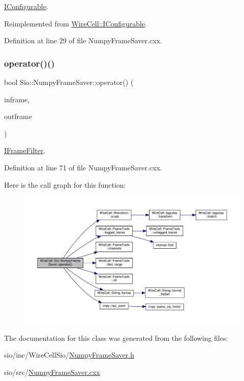 \hyperlink{class_wire_cell_1_1_i_configurable}{I\+Configurable}. 



Reimplemented from \hyperlink{class_wire_cell_1_1_i_configurable_a54841b2da3d1ea02189478bff96f7998}{Wire\+Cell\+::\+I\+Configurable}.



Definition at line 29 of file Numpy\+Frame\+Saver.\+cxx.

\mbox{\label{class_wire_cell_1_1_sio_1_1_numpy_frame_saver_aa4e56c63747bea244fd47f07b0d59303}} 
\subsubsection{\texorpdfstring{operator()()}{operator()()}}
{\footnotesize\ttfamily bool Sio\+::\+Numpy\+Frame\+Saver\+::operator() (\begin{DoxyParamCaption}\item[{const \hyperlink{class_wire_cell_1_1_i_data_aff870b3ae8333cf9265941eef62498bc}{Wire\+Cell\+::\+I\+Frame\+::pointer} \&}]{inframe,  }\item[{\hyperlink{class_wire_cell_1_1_i_data_aff870b3ae8333cf9265941eef62498bc}{Wire\+Cell\+::\+I\+Frame\+::pointer} \&}]{outframe }\end{DoxyParamCaption})\hspace{0.3cm}{\ttfamily [virtual]}}



\hyperlink{class_wire_cell_1_1_i_frame_filter}{I\+Frame\+Filter}. 



Definition at line 71 of file Numpy\+Frame\+Saver.\+cxx.

Here is the call graph for this function\+:
\nopagebreak
\begin{figure}[H]
\begin{center}
\leavevmode
\includegraphics[width=350pt]{class_wire_cell_1_1_sio_1_1_numpy_frame_saver_aa4e56c63747bea244fd47f07b0d59303_cgraph}
\end{center}
\end{figure}


The documentation for this class was generated from the following files\+:\begin{DoxyCompactItemize}
\item 
sio/inc/\+Wire\+Cell\+Sio/\hyperlink{_numpy_frame_saver_8h}{Numpy\+Frame\+Saver.\+h}\item 
sio/src/\hyperlink{_numpy_frame_saver_8cxx}{Numpy\+Frame\+Saver.\+cxx}\end{DoxyCompactItemize}
